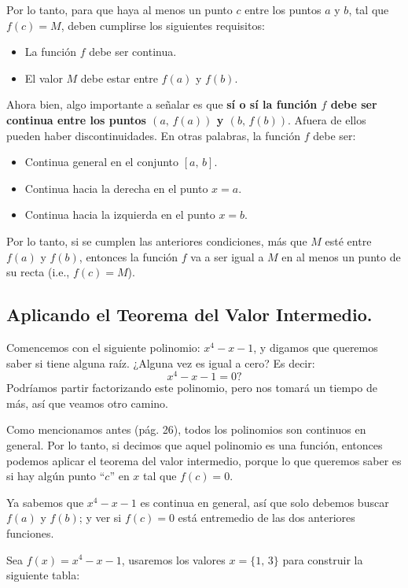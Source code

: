 \documentclass[12pt]{article}
\begin{document}
Por lo tanto, para que haya al menos un punto $c$ entre los puntos $a$ y $b$, tal que $f(c) = M$, deben cumplirse los siguientes requisitos:
\begin{itemize}
\item La función $f$ debe ser continua.
\item El valor $M$ debe estar entre $f(a)$ y $f(b)$.
\end{itemize}

Ahora bien, algo importante a señalar es que \textbf{sí o sí la función $f$ debe ser continua entre los puntos $(a, \, f(a))$ y $(b, \, f(b))$}. Afuera de ellos pueden haber discontinuidades. En otras palabras, la función $f$ debe ser:
\begin{itemize}
\item Continua general en el conjunto $[a, \, b]$.
\item Continua hacia la derecha en el punto $x = a$.
\item Continua hacia la izquierda en el punto $x = b$.
\end{itemize}

Por lo tanto, si se cumplen las anteriores condiciones, más que $M$ esté entre $f(a)$ y $f(b)$, entonces la función $f$ va a ser igual a $M$ en al menos un punto de su recta (i.e., $f(c) = M$).

\newpage


\subsection{Aplicando el Teorema del Valor Intermedio.}

Comencemos con el siguiente polinomio: $x^{4} - x - 1$, y digamos que queremos saber si tiene alguna raíz. ¿Alguna vez es igual a cero? Es decir:
\[x^{4} - x - 1 = 0 ?\]
Podríamos partir factorizando este polinomio, pero nos tomará un tiempo de más, así que veamos otro camino.

Como mencionamos antes (pág. 26), todos los polinomios son continuos en general. Por lo tanto, si decimos que aquel polinomio es una función, entonces podemos aplicar el teorema del valor intermedio, porque lo que queremos saber es si hay algún punto ``$c$'' en $x$ tal que $f(c) = 0$.

Ya sabemos que $x^{4} - x - 1$ es continua en general, así que solo debemos buscar $f(a)$ y $f(b)$; y ver si $f(c) = 0$ está entremedio de las dos anteriores funciones.

Sea $f(x) = x^{4} - x - 1$, usaremos los valores $x = \{1, \, 3\}$ para construir la siguiente tabla:
\end{document}
